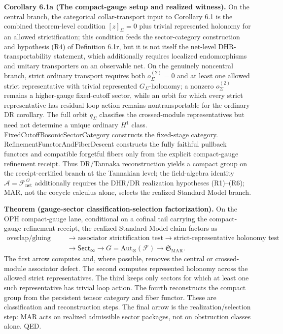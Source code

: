 \textbf{Corollary 6.1a (The compact-gauge setup and realized witness).} On the central branch, the categorical collar-transport input to Corollary 6.1 is the combined theorem-level condition \([z]_\Sigma=0\) plus trivial represented holonomy for an allowed strictification; this condition feeds the sector-category construction and hypothesis (R4) of Definition 6.1r, but it is not itself the net-level DHR-transportability statement, which additionally requires localized endomorphisms and unitary transporters on an observable net. On the genuinely noncentral branch, strict ordinary transport requires both \(o^{(2)}_\Sigma=0\) and at least one allowed strict representative with trivial represented \(G_\Sigma\)-holonomy; a nonzero \(o^{(2)}_\Sigma\) remains a higher-gauge fixed-cutoff sector, while an orbit for which every strict representative has residual loop action remains nontransportable for the ordinary DR corollary. The full orbit \(q_\Sigma\) classifies the crossed-module representatives but need not determine a unique ordinary \(H^1\) class. FixedCutoffBosonicSectorCategory constructs the fixed-stage category. RefinementFunctorAndFiberDescent constructs the fully faithful pullback functors and compatible forgetful fibers only from the explicit compact-gauge refinement receipt. Thus DR/Tannaka reconstruction yields a compact group on the receipt-certified branch at the Tannakian level; the field-algebra identity \(\mathcal A=\mathcal F_{\mathrm{net}}^{\,G}\) additionally requires the DHR/DR realization hypotheses (R1)--(R6); MAR, not the cocycle calculus alone, selects the realized Standard Model branch.

\textbf{Theorem (gauge-sector classification-selection factorization).} On the OPH compact-gauge
lane, conditional on a cofinal tail carrying the compact-gauge refinement receipt, the realized Standard Model claim factors as
\[
\begin{aligned}
\text{overlap/gluing data}
&\longrightarrow \text{associator strictification test}
\longrightarrow \text{strict-representative holonomy test}\\
&\longrightarrow \mathsf{Sect}_\infty
\longrightarrow G=\mathrm{Aut}_\otimes(\mathcal F)
\longrightarrow \mathfrak S_{\mathrm{MAR}}.
\end{aligned}
\]
The first arrow computes and, where possible, removes the central or crossed-module associator
defect. The second computes represented holonomy across the allowed strict representatives. The
third keeps only sectors for which at least one such representative has trivial loop action. The fourth reconstructs the compact
group from the persistent tensor category and fiber functor. These are classification and
reconstruction steps. The final arrow is the realization/selection step: MAR acts on realized
admissible sector packages, not on obstruction classes alone. QED.

